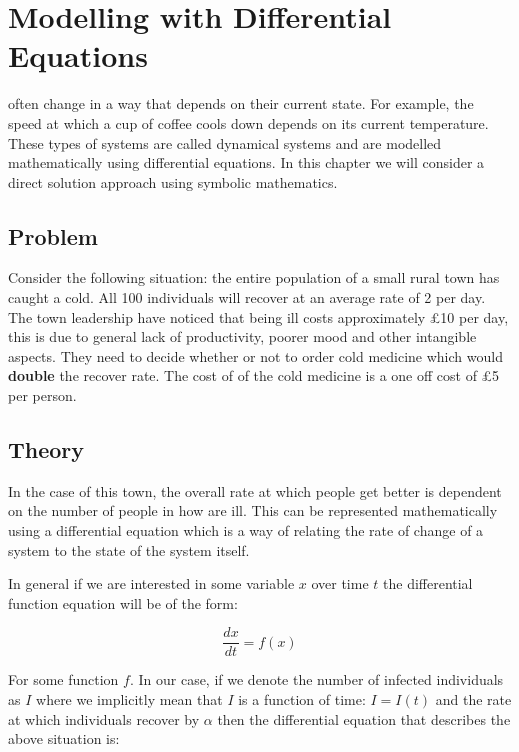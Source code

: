 \chapter[Modelling with Differential Equations]{Modelling with Differential Equations}

 often change in a way that depends on their current
state. For example, the speed at which a cup of coffee cools down depends on its
current temperature. These types of systems are called dynamical systems and are
modelled mathematically using differential equations. In this chapter we will
consider a direct solution approach using symbolic mathematics.

\section{Problem}\label{sec:problem}

Consider the following situation: the entire population of a small rural town
has caught a cold. All 100 individuals will recover at an average rate of 2 per
day.  The town leadership have noticed that being ill costs approximately
\pounds10 per day, this is due to general lack of productivity, poorer mood and
other intangible aspects. They need to decide whether or not to order cold
medicine which would \textbf{double} the recover rate. The cost of of the cold
medicine is a one off cost of \pounds5 per person.

\section{Theory}\label{sec:theory}

In the case of this town, the overall rate at which people get better is
dependent on the number of people in how are ill. This can be represented
mathematically using a differential equation which is a way of relating the rate
of change of a system to the state of the system itself.

In general if we are interested in some variable \(x\) over time \(t\) the
differential function equation will be of the form:

\begin{equation}
    \frac{dx}{dt} = f(x)
\end{equation}

For some function \(f\).
In our case,
if we denote the number of infected individuals as \(I\) where we implicitly
mean that \(I\) is a function of time: \(I=I(t)\) and the rate at which
individuals recover by \(\alpha\) then the differential equation
that describes the above situation is:


